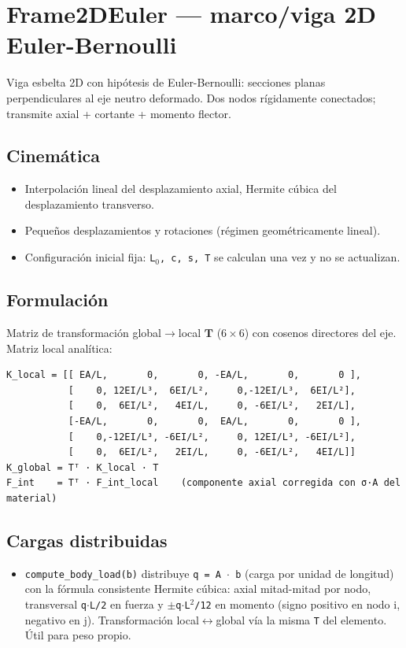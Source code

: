 \documentclass[11pt,letterpaper,oneside]{report}
\begin{document}
\section{Frame2DEuler --- marco/viga 2D Euler-Bernoulli}

Viga esbelta 2D con hipótesis de Euler-Bernoulli: secciones planas perpendiculares al eje neutro deformado. Dos nodos rígidamente conectados; transmite axial + cortante + momento flector.

\subsection{Cinemática}
\begin{itemize}
  \item Interpolación lineal del desplazamiento axial, Hermite cúbica del desplazamiento transverso.
  \item Pequeños desplazamientos y rotaciones (régimen geométricamente lineal).
  \item Configuración inicial fija: \texttt{L\ensuremath{_{0}}, c, s, T} se calculan una vez y no se actualizan.
\end{itemize}

\subsection{Formulación}
Matriz de transformación global\ensuremath{\to}local $\mathbf T$ ($6\times 6$) con cosenos directores del eje. Matriz local analítica:
\begin{lstlisting}
K_local = [[ EA/L,       0,       0, -EA/L,       0,       0 ],
           [    0, 12EI/L³,  6EI/L²,     0,-12EI/L³,  6EI/L²],
           [    0,  6EI/L²,   4EI/L,     0, -6EI/L²,   2EI/L],
           [-EA/L,       0,       0,  EA/L,       0,       0 ],
           [    0,-12EI/L³, -6EI/L²,     0, 12EI/L³, -6EI/L²],
           [    0,  6EI/L²,   2EI/L,     0, -6EI/L²,   4EI/L]]
K_global = Tᵀ · K_local · T
F_int    = Tᵀ · F_int_local    (componente axial corregida con σ·A del material)

\end{lstlisting}

\subsection{Cargas distribuidas}
\begin{itemize}
  \item \texttt{compute\_body\_load(b)} distribuye \texttt{q = A \ensuremath{\cdot} b} (carga por unidad de longitud) con la fórmula consistente Hermite cúbica: axial mitad-mitad por nodo, transversal \texttt{q\ensuremath{\cdot}L/2} en fuerza y \texttt{\ensuremath{\pm}q\ensuremath{\cdot}L\ensuremath{^{2}}/12} en momento (signo positivo en nodo i, negativo en j). Transformación local\ensuremath{\leftrightarrow}global vía la misma \texttt{T} del elemento. Útil para peso propio.
\end{itemize}
\end{document}
